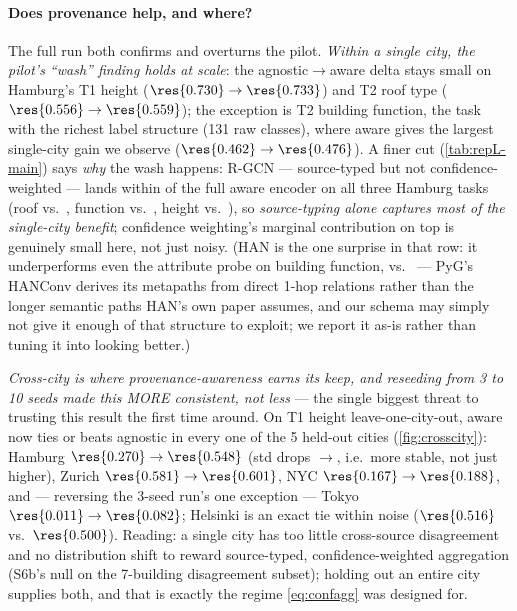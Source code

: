 \paragraph{Does provenance help, and where?}
The full run both confirms and overturns the pilot. \emph{Within a single
city, the pilot's ``wash'' finding holds at scale}: the agnostic$\to$aware
delta stays small on Hamburg's T1 height ($\res{0.730}\to\res{0.733}$) and T2 roof
type ($\res{0.556}\to\res{0.559}$); the exception is T2 building function, the
task with the richest label structure (131 raw classes), where aware gives the
largest single-city gain we observe ($\res{0.462}\to\res{0.476}$). A finer cut
(\cref{tab:repL-main}) says \emph{why} the wash happens: R-GCN --- source-typed
but not confidence-weighted --- lands within  of the full aware
encoder on all three Hamburg tasks (roof  vs.\ , function
 vs.\ , height  vs.\ ), so
\emph{source-typing alone captures most of the single-city benefit}; confidence
weighting's marginal contribution on top is genuinely small here, not just
noisy. (HAN is the one surprise in that row: it underperforms even the
attribute probe on building function,  vs.\  --- PyG's
HANConv derives its metapaths from direct 1-hop relations rather than the
longer semantic paths HAN's own paper assumes, and our schema may simply not
give it enough of that structure to exploit; we report it as-is rather than
tuning it into looking better.)

\emph{Cross-city is where provenance-awareness earns its keep, and reseeding
from 3 to 10 seeds made this MORE consistent, not less} --- the single biggest
threat to trusting this result the first time around. On T1 height
leave-one-city-out, aware now ties or beats agnostic in every one of the 5
held-out cities (\cref{fig:crosscity}): Hamburg $\res{0.270}\to\res{0.548}$
(std drops $\to$, i.e.\ more stable, not just higher),
Zurich $\res{0.581}\to\res{0.601}$, NYC $\res{0.167}\to\res{0.188}$, and ---
reversing the 3-seed run's one exception --- Tokyo $\res{0.011}\to\res{0.082}$;
Helsinki is an exact tie within noise ($\res{0.516}$ vs.\ $\res{0.500}$). Reading:
a single city has too little cross-source disagreement and no distribution
shift to reward source-typed, confidence-weighted aggregation (S6b's null on
the 7-building disagreement subset); holding out an entire city supplies both,
and that is exactly the regime \cref{eq:confagg} was designed for.

